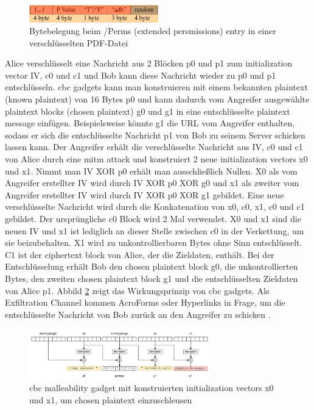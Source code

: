 \begin{figure}[!htb]
	\centering
	\includegraphics[width=0.5\textwidth]{"images/perms-ccc-break-pdf.png"}
	\caption{Bytebelegung beim /Perms (extended persmissions) entry in einer verschlüsselten PDF-Datei \cite{ccc-break-pdf}}
	\label{fig:perms}
\end{figure}

Alice verschlüsselt eine Nachricht aus 2 Blöcken p0 und p1 zum initialization vector IV, c0 und c1 und Bob kann diese Nachricht wieder zu p0 und p1 entschlüsseln. \gls{cbc} gadgets kann man konstruieren mit einem bekannten plaintext (known plaintext) von 16 Bytes p0 und kann dadurch vom Angreifer ausgewählte plaintext blocks (chosen plaintext) g0 und g1 in eine entschlüsselte plaintext message einfügen. Beispielsweise könnte g1 die URL vom Angreifer enthalten, sodass er sich die entschlüsselte Nachricht p1 von Bob zu seinem Server schicken lassen kann. Der Angreifer erhält die verschlüsselte Nachricht aus IV, c0 und c1 von Alice durch eine \gls{mitm} attack und konstruiert 2 neue initialization vectors x0 und x1. Nimmt man IV XOR p0 erhält man ausschließlich Nullen. X0 als vom Angreifer erstellter IV wird durch IV XOR p0 XOR g0 und x1 als zweiter vom Angreifer erstellter IV wird durch IV XOR p0 XOR g1 gebildet. Eine neue verschlüsselte Nachricht wird durch die Konkatenation von x0, c0, x1, c0 und c1 gebildet. Der ursprüngliche c0 Block wird 2 Mal verwendet. X0 und x1 sind die neuen IV und x1 ist lediglich an dieser Stelle zwischen c0 in der Verkettung, um sie beizubehalten. X1 wird zu unkontrollierbaren Bytes ohne Sinn entschlüsselt. C1 ist der ciphertext block von Alice, der die Zieldaten, enthält. Bei der Entschlüsselung erhält Bob den chosen plaintext block g0, die unkontrollierten Bytes, den zweiten chosen plaintext block g1 und die entschlüsselten Zieldaten von Alice p1. Abbild \ref{fig:gadget} zeigt das Wirkungsprinzip von \gls{cbc} gadgets. Als Exfiltration Channel kommen AcroForms oder Hyperlinks in Frage, um die entschlüsselte Nachricht von Bob zurück an den Angreifer zu schicken \cite{gadget, ccc-break-pdf, crypto-web}.
\par

\begin{figure}[!htb]
	\centering
	\includegraphics[width=0.7\textwidth]{"images/gadget2-gadget.png"}
	\caption{\gls{cbc} malleability gadget mit konstruierten initialization vectors x0 und x1, um chosen plaintext einzuschleusen \cite{gadget}}
	\label{fig:gadget}
\end{figure}

